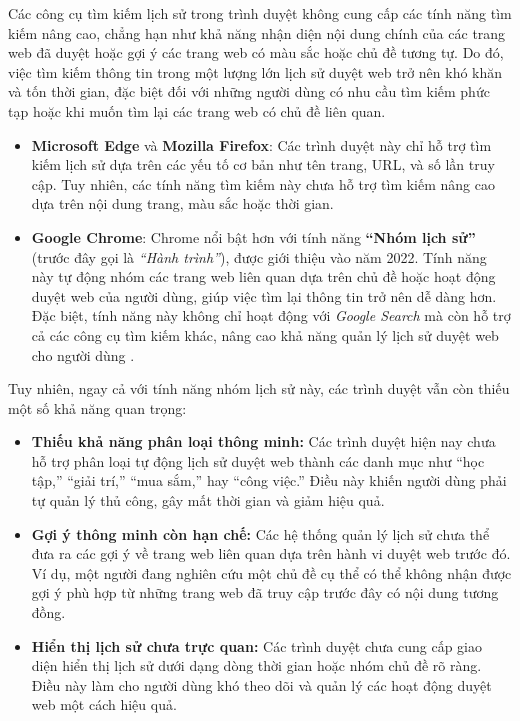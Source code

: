 Các công cụ tìm kiếm lịch sử trong trình duyệt không cung cấp các tính năng tìm kiếm nâng cao, chẳng hạn như khả năng nhận diện nội dung chính của các trang web đã duyệt hoặc gợi ý các trang web có màu sắc hoặc chủ đề tương tự. Do đó, việc tìm kiếm thông tin trong một lượng lớn lịch sử duyệt web trở nên khó khăn và tốn thời gian, đặc biệt đối với những người dùng có nhu cầu tìm kiếm phức tạp hoặc khi muốn tìm lại các trang web có chủ đề liên quan.

\begin{itemize}
    \item \textbf{Microsoft Edge} và \textbf{Mozilla Firefox}: Các trình duyệt này chỉ hỗ trợ tìm kiếm lịch sử dựa trên các yếu tố cơ bản như tên trang, URL, và số lần truy cập. Tuy nhiên, các tính năng tìm kiếm này chưa hỗ trợ tìm kiếm nâng cao dựa trên nội dung trang, màu sắc hoặc thời gian.
    
    \item \textbf{Google Chrome}: Chrome nổi bật hơn với tính năng \textbf{``Nhóm lịch sử''} (trước đây gọi là \textit{``Hành trình''}), được giới thiệu vào năm 2022. Tính năng này tự động nhóm các trang web liên quan dựa trên chủ đề hoặc hoạt động duyệt web của người dùng, giúp việc tìm lại thông tin trở nên dễ dàng hơn. Đặc biệt, tính năng này không chỉ hoạt động với \textit{Google Search} mà còn hỗ trợ cả các công cụ tìm kiếm khác, nâng cao khả năng quản lý lịch sử duyệt web cho người dùng \cite{chrome_journeys}.
\end{itemize}

Tuy nhiên, ngay cả với tính năng nhóm lịch sử này, các trình duyệt vẫn còn thiếu một số khả năng quan trọng:

\begin{itemize}
    \item \textbf{Thiếu khả năng phân loại thông minh:} Các trình duyệt hiện nay chưa hỗ trợ phân loại tự động lịch sử duyệt web thành các danh mục như ``học tập,'' ``giải trí,'' ``mua sắm,'' hay ``công việc.'' Điều này khiến người dùng phải tự quản lý thủ công, gây mất thời gian và giảm hiệu quả.
    
    \item \textbf{Gợi ý thông minh còn hạn chế:} Các hệ thống quản lý lịch sử chưa thể đưa ra các gợi ý về trang web liên quan dựa trên hành vi duyệt web trước đó. Ví dụ, một người đang nghiên cứu một chủ đề cụ thể có thể không nhận được gợi ý phù hợp từ những trang web đã truy cập trước đây có nội dung tương đồng.
    
    \item \textbf{Hiển thị lịch sử chưa trực quan:} Các trình duyệt chưa cung cấp giao diện hiển thị lịch sử dưới dạng dòng thời gian hoặc nhóm chủ đề rõ ràng. Điều này làm cho người dùng khó theo dõi và quản lý các hoạt động duyệt web một cách hiệu quả.
\end{itemize}

